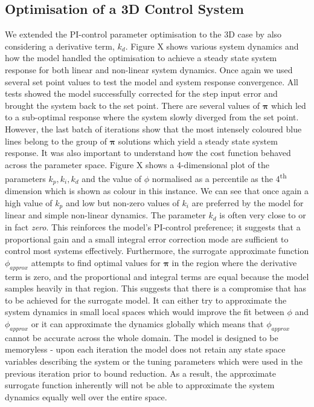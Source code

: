 \documentclass[conference]{IEEEtran}
\theoremstyle{definition}
\newcommand{\ts}{\textsuperscript}
\begin{document}
\subsection{Optimisation of a 3D Control System}
We extended the PI-control parameter optimisation to the 3D case by also considering a derivative term, $k_d$. Figure X shows various system dynamics and how the model handled the optimisation to achieve a steady state system response for both linear and non-linear system dynamics. Once again we used several set point values to test the model and system response convergence. All tests showed the model successfully corrected for the step input error and brought the system back to the set point. There are several values of $\boldsymbol \pi$ which led to a sub-optimal response where the system slowly diverged from the set point. However, the last batch of iterations show that the most intensely coloured blue lines belong to the group of $\boldsymbol \pi$ solutions which yield a steady state system response. It was also important to understand how the cost function behaved across the parameter space. Figure X shows a 4-dimensional plot of the parameters $k_p, k_i, k_d$ and the value of $\phi$ normalised as a percentile as the 4\ts{th} dimension which is shown as colour in this instance. We can see that once again a high value of $k_p$ and low but non-zero values of $k_i$ are preferred by the model for linear and simple non-linear dynamics. The parameter $k_d$ is often very close to or in fact \textit{zero}. This reinforces the model's PI-control preference; it suggests that a proportional gain and a small integral error correction mode are sufficient to control most systems effectively. Furthermore, the surrogate approximate function $\phi_{approx}$ attempts to find optimal values for $\boldsymbol \pi$ in the region where the derivative term is zero, and the proportional and integral terms are equal because the model samples heavily in that region. This suggests that there is a compromise that has to be achieved for the surrogate model. It can either try to approximate the system dynamics in small local spaces which would improve the fit between $\phi$ and $\phi_{approx}$ or it can approximate the dynamics globally which means that $\phi_{approx}$ cannot be accurate across the whole domain. The model is designed to be memoryless - upon each iteration the model does not retain any state space variables describing the system or the tuning parameters which were used in the previous iteration prior to bound reduction. As a result, the approximate surrogate function inherently will not be able to approximate the system dynamics equally well over the entire space. 
\end{document}
